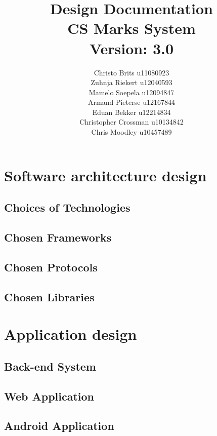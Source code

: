 \documentclass[12pt,a4paper]{article}
\begin{document}
\begin{titlepage}
\title{Design Documentation\\CS Marks System\\ \small Version: 3.0}
\author{Christo Brits u11080923\\
Zuhnja Riekert u12040593\\
Mamelo Soepela u12094847\\
Armand Pieterse u12167844\\
Eduan Bekker u12214834\\
Christopher Crossman u10134842\\
Chris Moodley u10457489}
\maketitle
\end{titlepage}
\tableofcontents
\pagebreak
\section{Software architecture design}
\subsection{Choices of Technologies}
\subsection{Chosen Frameworks}
\subsection{Chosen Protocols}
\subsection{Chosen Libraries}
\pagebreak
\section{Application design}
\subsection{Back-end System}
\subsection{Web Application}
\subsection{Android Application}
\end{document}
